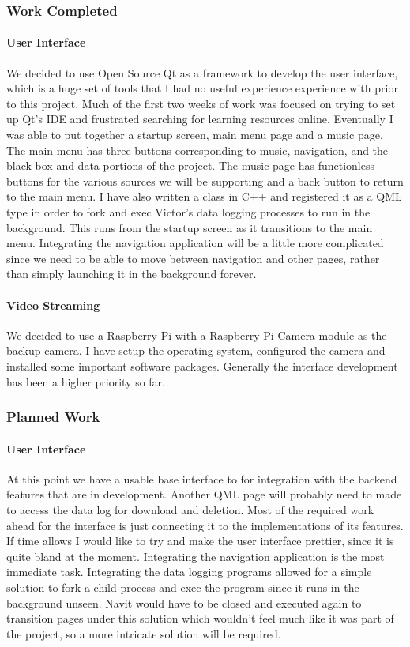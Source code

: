 \documentclass[onecolumn, draftclsnofoot,10pt, compsoc]{IEEEtran}
\begin{document}
\subsubsection{Work Completed}
\paragraph{User Interface}
We decided to use Open Source Qt as a framework to develop the user interface, which is a huge set of tools that I had no useful experience experience with prior to this project. Much of the first two weeks of work was focused on trying to set up Qt's IDE and frustrated searching for learning resources online. Eventually I was able to put together a startup screen, main menu page and a music page. The main menu has three buttons corresponding to music, navigation, and the black box and data portions of the project. The music page has functionless buttons for the various sources we will be supporting and a back button to return to the main menu. I have also written a class in C++ and registered it as a QML type in order to fork and exec Victor's data logging processes to run in the background. This runs from the startup screen as it transitions to the main menu. Integrating the navigation application will be a little more complicated since we need to be able to move between navigation and other pages, rather than simply launching it in the background forever.\par

\paragraph{Video Streaming}
We decided to use a Raspberry Pi with a Raspberry Pi Camera module as the backup camera. I have setup the operating system, configured the camera and installed some important software packages. Generally the interface development has been a higher priority so far.\par

\subsubsection{Planned Work}
\paragraph{User Interface}
At this point we have a usable base interface to for integration with the backend features that are in development. Another QML page will probably need to made to access the data log for download and deletion. Most of the required work ahead for the interface is just connecting it to the implementations of its features. If time allows I would like to try and make the user interface prettier, since it is quite bland at the moment. Integrating the navigation application is the most immediate task. Integrating the data logging programs allowed for a simple solution to fork a child process and exec the program since it runs in the background unseen. Navit would have to be closed and executed again to transition pages under this solution which wouldn't feel much like it was part of the project, so a more intricate solution will be required.\par
\end{document}

